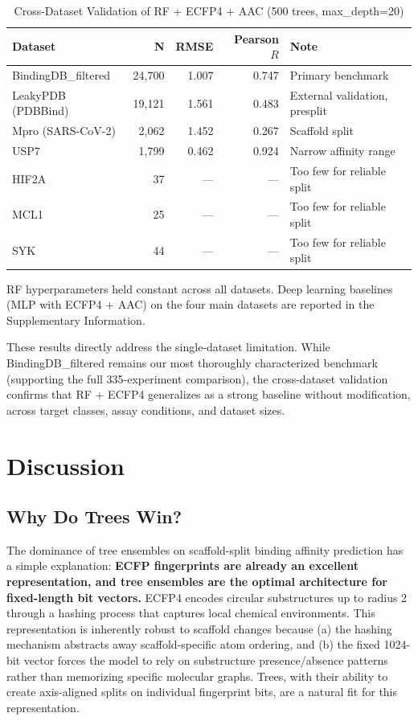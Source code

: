 \documentclass[11pt,twocolumn,a4paper]{article}
\begin{document}
\begin{table}[t]
\centering
\caption{Cross-Dataset Validation of RF + ECFP4 + AAC (500 trees, max\_depth=20)}
\label{tab:cross_dataset}
\begin{tabular}{lrrrl}
\toprule
\textbf{Dataset} & \textbf{N} & \textbf{RMSE} & \textbf{Pearson $R$} & \textbf{Note} \\
\midrule
BindingDB\_filtered & 24,700 & 1.007 & 0.747 & Primary benchmark \\
LeakyPDB (PDBBind)  & 19,121 & 1.561 & 0.483 & External validation, presplit \\
Mpro (SARS-CoV-2)   & 2,062  & 1.452 & 0.267 & Scaffold split \\
USP7                & 1,799  & 0.462 & 0.924 & Narrow affinity range \\
HIF2A               & 37     & ---   & ---   & Too few for reliable split \\
MCL1                & 25     & ---   & ---   & Too few for reliable split \\
SYK                 & 44     & ---   & ---   & Too few for reliable split \\
\bottomrule
\end{tabular}
\vspace{4pt}
\footnotesize{RF hyperparameters held constant across all datasets. Deep learning baselines (MLP with ECFP4 + AAC) on the four main datasets are reported in the Supplementary Information.}
\end{table}

These results directly address the single-dataset limitation. While BindingDB\_filtered remains our most thoroughly characterized benchmark (supporting the full 335-experiment comparison), the cross-dataset validation confirms that RF + ECFP4 generalizes as a strong baseline without modification, across target classes, assay conditions, and dataset sizes.

\section{Discussion}

\subsection{Why Do Trees Win?}

The dominance of tree ensembles on scaffold-split binding affinity prediction has a simple explanation: \textbf{ECFP fingerprints are already an excellent representation, and tree ensembles are the optimal architecture for fixed-length bit vectors.} ECFP4 encodes circular substructures up to radius 2 through a hashing process that captures local chemical environments. This representation is inherently robust to scaffold changes because (a) the hashing mechanism abstracts away scaffold-specific atom ordering, and (b) the fixed 1024-bit vector forces the model to rely on substructure presence/absence patterns rather than memorizing specific molecular graphs. Trees, with their ability to create axis-aligned splits on individual fingerprint bits, are a natural fit for this representation.
\end{document}
